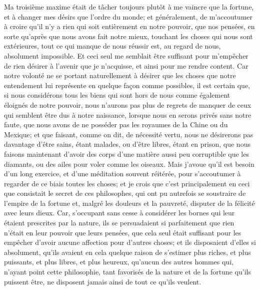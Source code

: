 \documentclass[french,twoside]{book} %
\begin{document}
Ma troisième maxime était de tâcher toujours plutôt à me vaincre que la fortune, et à changer mes désirs que l'ordre du monde; et généralement, de m'accoutumer à croire qu'il n'y a rien qui soit entièrement en notre pouvoir, que nos pensées, en sorte qu'après que nous avons fait notre mieux, touchant les choses qui nous sont extérieures, tout ce qui manque de nous réussir est, au regard de nous, absolument impossible. Et ceci seul me semblait être suffisant pour m'empêcher de rien désirer à l'avenir que je n'acquisse, et ainsi pour me rendre content. Car notre volonté ne se portant naturellement à désirer que les choses que notre entendement lui représente en quelque façon comme possibles, il est certain que, si nous considérons tous les biens qui sont hors de nous comme également éloignés de notre pouvoir, nous n'aurons pas plus de regrets de manquer de ceux qui semblent être dus à notre naissance, lorsque nous en serons privés sans notre faute, que nous avons de ne posséder pas les royaumes de la Chine ou du Mexique; et que faisant, comme on dit, de nécessité vertu, nous ne désirerons pas davantage d'être sains, étant malades, ou d'être libres, étant en prison, que nous faisons maintenant d'avoir des corps d'une matière aussi peu corruptible que les diamants, ou des ailes pour voler comme les oiseaux. Mais j'avoue qu'il est besoin d'un long exercice, et d'une méditation souvent réitérée, pour s'accoutumer à regarder de ce biais toutes les choses; et je crois que c'est principalement en ceci que consistait le secret de ces philosophes, qui ont pu autrefois se soustraire de l'empire de la fortune et, malgré les douleurs et la pauvreté, disputer de la félicité avec leurs dieux. Car, s'occupant sans cesse à considérer les bornes qui leur étaient prescrites par la nature, ils se persuadaient si parfaitement que rien n'était en leur pouvoir que leurs pensées, que cela seul était suffisant pour les empêcher d'avoir aucune affection pour d'autres choses; et ils disposaient d'elles si absolument, qu'ils avaient en cela quelque raison de s'estimer plus riches, et plus puissants, et plus libres, et plus heureux, qu'aucun des autres hommes qui, n'ayant point cette philosophie, tant favorisés de la nature et de la fortune qu'ils puissent être, ne disposent jamais ainsi de tout ce qu'ils veulent.\par
\end{document}

